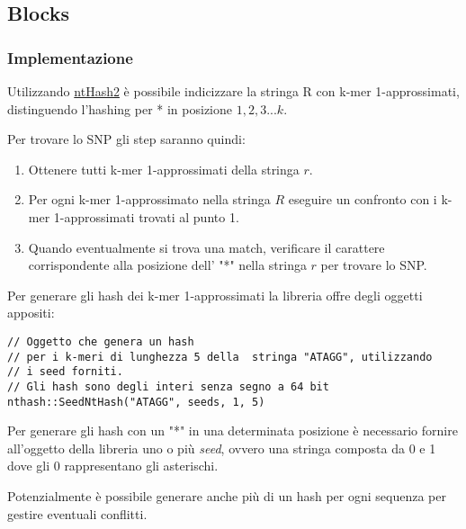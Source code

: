 \documentclass[
	11pt, %
]{beamer}
\begin{document}

\subsection{Blocks}

\begin{frame}
	\frametitle{Implementazione}
	
	Utilizzando  \href{https://github.com/bcgsc/ntHash}{ntHash2} è possibile indicizzare la stringa R con k-mer 1-approssimati, distinguendo l'hashing per * in posizione $1,2,3...k$.
	
	Per trovare lo SNP gli step saranno quindi:
\begin{enumerate} 
	\item	Ottenere tutti k-mer 1-approssimati della stringa $r$.
	\item  Per ogni k-mer 1-approssimato nella stringa $R$ eseguire un confronto con i k-mer 1-approssimati trovati al punto 1.
	\item Quando eventualmente si trova una match, verificare il carattere corrispondente alla posizione dell' "*" nella stringa $r$ per trovare lo SNP.
\end{enumerate}
	

\end{frame}


\begin{frame}[fragile]
	Per generare gli hash dei k-mer 1-approssimati la libreria offre degli oggetti appositi:
	
\begin{lstlisting}
// Oggetto che genera un hash
// per i k-meri di lunghezza 5 della  stringa "ATAGG", utilizzando
// i seed forniti.
// Gli hash sono degli interi senza segno a 64 bit
nthash::SeedNtHash("ATAGG", seeds, 1, 5)
\end{lstlisting}
	
	Per generare gli hash con un "*" in una determinata posizione è necessario fornire all'oggetto della libreria uno o più \textit{seed},  ovvero una stringa composta da 0 e 1 dove gli 0 rappresentano gli asterischi.
	
	Potenzialmente è possibile generare anche più di un hash per ogni sequenza per gestire eventuali conflitti.
	
\end{frame}
\end{document}
